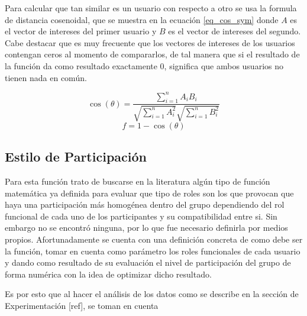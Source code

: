 Para calcular que tan similar es un usuario con respecto a otro se usa la formula de distancia cosenoidal, que se muestra en la ecuación \ref{eq_cos_sym} donde \(A\) es el vector de intereses del primer usuario y \(B\) es el vector de intereses del segundo. Cabe destacar que es muy frecuente que los vectores de intereses de los usuarios contengan ceros al momento de compararlos, de tal manera que si el resultado de la función da como resultado exactamente 0, significa que ambos usuarios no tienen nada en común. 

\begin{equation} \label{eq_cos_sym}
    \cos(\theta) = \frac{ \sum\limits_{i=1}^{n}{A_i  B_i} }{ \sqrt{\sum\limits_{i=1}^{n}{A_i^2}}  \sqrt{\sum\limits_{i=1}^{n}{B_i^2}} }   
\end{equation}
\begin{equation}\label{eq_interests}
	f = 1 - \cos(\theta) 
\end{equation}

\subsection{Estilo de Participación}

Para esta función trato de buscarse en la literatura algún tipo de función matemática ya definida para evaluar que tipo de roles son los que provocan que haya una participación más homogénea dentro del grupo dependiendo del rol funcional de cada uno de los participantes y su compatibilidad entre si. Sin embargo no se encontró ninguna, por lo que fue necesario definirla por medios propios. Afortunadamente se cuenta con una definición concreta de como debe ser la función, tomar en cuenta como parámetro los roles funcionales de cada usuario y dando como resultado de su evaluación el nivel de participación del grupo de forma numérica con la idea de optimizar dicho resultado.

Es por esto que al hacer el análisis de los datos como se describe en la sección de Experimentación [ref], se toman en cuenta 


